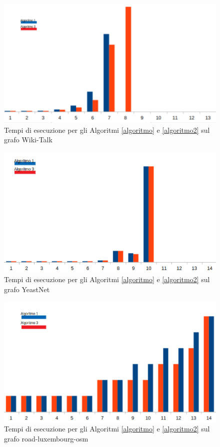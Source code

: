 \begin{figure}[htbp]
	\includegraphics[width=15.4cm]{capitolo4/tempiWIKI}
	\caption{Tempi di esecuzione per gli Algoritmi \ref{algoritmo} e \ref{algoritmo2} sul grafo Wiki-Talk}
	\label{Tempi:1}
\end{figure}
\begin{figure}[htbp]
	\includegraphics[width=15.4cm]{capitolo4/tempiYEAST}
	\caption{Tempi di esecuzione per gli Algoritmi \ref{algoritmo} e \ref{algoritmo2} sul grafo YeastNet}
	\label{Tempi:2}
\end{figure}
\begin{figure}[htbp]
	\includegraphics[width=15.4cm]{capitolo4/tempiROAD}
	\caption{Tempi di esecuzione per gli Algoritmi \ref{algoritmo} e \ref{algoritmo2} sul grafo road-luxembourg-osm}
	\label{Tempi:3}
\end{figure}
